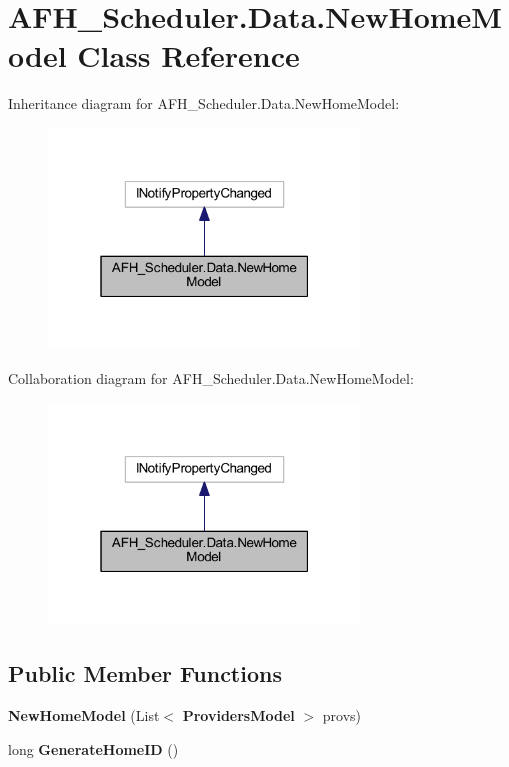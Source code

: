\section{A\+F\+H\+\_\+\+Scheduler.\+Data.\+New\+Home\+Model Class Reference}
\label{class_a_f_h___scheduler_1_1_data_1_1_new_home_model}


Inheritance diagram for A\+F\+H\+\_\+\+Scheduler.\+Data.\+New\+Home\+Model\+:
\nopagebreak
\begin{figure}[H]
\begin{center}
\leavevmode
\includegraphics[width=235pt]{class_a_f_h___scheduler_1_1_data_1_1_new_home_model__inherit__graph}
\end{center}
\end{figure}


Collaboration diagram for A\+F\+H\+\_\+\+Scheduler.\+Data.\+New\+Home\+Model\+:
\nopagebreak
\begin{figure}[H]
\begin{center}
\leavevmode
\includegraphics[width=235pt]{class_a_f_h___scheduler_1_1_data_1_1_new_home_model__coll__graph}
\end{center}
\end{figure}
\subsection*{Public Member Functions}
\begin{DoxyCompactItemize}
\item 
\textbf{ New\+Home\+Model} (List$<$ \textbf{ Providers\+Model} $>$ provs)
\item 
long \textbf{ Generate\+Home\+ID} ()
\end{DoxyCompactItemize}
